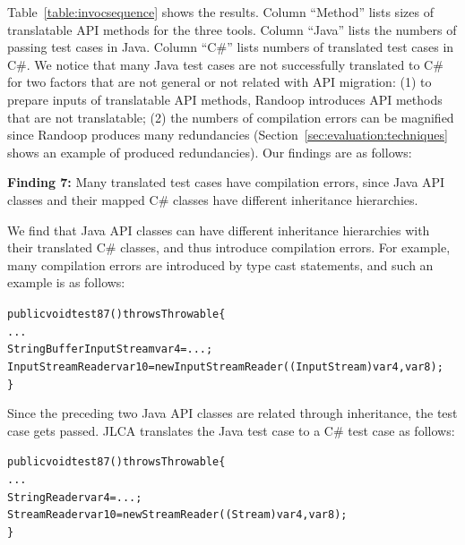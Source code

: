 Table~\ref{table:invocsequence} shows the results. Column ``Method'' lists sizes of translatable API methods for the three tools. Column ``Java'' lists the numbers of passing test cases in Java. Column ``C\#'' lists numbers of translated test cases in C\#. We notice that many Java test cases are not successfully translated to C\# for two factors that are not general or not related with API migration: (1) to prepare inputs of translatable API methods, Randoop introduces API methods that are not translatable; (2) the numbers of compilation errors can be magnified since Randoop produces many redundancies (Section~\ref{sec:evaluation:techniques} shows an example of produced redundancies). Our findings are as follows:

\textbf{Finding 7:} Many translated test cases have compilation errors, since Java API classes and their mapped C\# classes have different inheritance hierarchies.

We find that Java API classes can have different inheritance hierarchies with their translated C\# classes, and thus introduce compilation errors. For example, many compilation errors are introduced by type cast statements, and such an example is as follows:

\begin{CodeOut}%
\begin{alltt}
public void test87() throws Throwable\{
  ...
  StringBufferInputStream var4 = ...;
  InputStreamReader var10 = new InputStreamReader((InputStream)var4, var8);
\}
\end{alltt}
\end{CodeOut}%

Since the preceding two Java API classes are related through inheritance, the test case gets passed. JLCA translates the Java test case to a C\# test case as follows:

\begin{CodeOut}%
\begin{alltt}
public void test87() throws Throwable\{
  ...
  StringReader var4 = ...;
  StreamReader var10 = new StreamReader((Stream)var4, var8);
\}
\end{alltt}
\end{CodeOut}%

